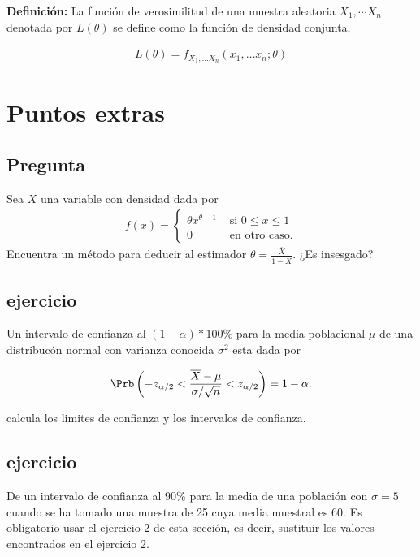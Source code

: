 \documentclass{assignment}
\begin{document}
\textbf{Definición:}
La función de verosimilitud de una muestra aleatoria $X_1, \cdots X_n$ denotada por $L(\theta)$ se define como la función de densidad conjunta, 

\begin{align*}
	L(\theta) = f_{X_1, \dots X_n}(x_1, \dots x_n;\theta) 
\end{align*}


\section{Puntos extras}

 \subsection{Pregunta}
Sea $X$ una variable con densidad dada por 
\begin{align*}
f(x) = \begin{cases}
\theta x ^{\theta-1} & \text{ si } 0 \leq x \leq 1 \\
0 & \text{ en otro caso.}
\end{cases}
\end{align*}
Encuentra un método para deducir al estimador $\theta = \frac{\overline{X}}{1-\overline{X}}$. ¿Es insesgado?

 \subsection{ejercicio}
Un intervalo de confianza al $(1- \alpha)*100\%$ para la media poblacional $\mu$ de una distribucón normal con varianza conocida $\sigma^2$ esta dada por 

\begin{align*}
	\Prb \left( -z_{\alpha/2} < \frac{\overline{X}-\mu}{\sigma /\sqrt{n}} < z_{\alpha/2} \right)=1-\alpha.
\end{align*}

calcula los limites de confianza y los intervalos de confianza. 

 \subsection{ejercicio}
De un intervalo de confianza al $90\%$ para la media de una población con $\sigma = 5$ cuando se ha tomado una muestra de 25 cuya media muestral es 60. Es obligatorio usar el ejercicio 2 de esta sección, es decir, sustituir los valores encontrados en el ejercicio 2.  
\end{document}
